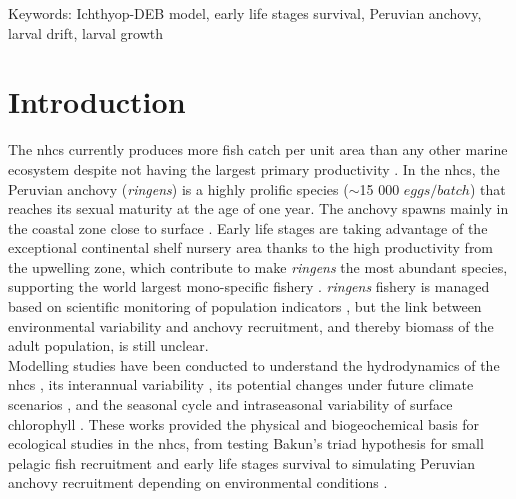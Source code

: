 Keywords: Ichthyop-DEB model, early life stages survival, Peruvian anchovy, larval drift, larval growth

\clearpage
\section{Introduction}\label{Chap3Intro}

The \acrfull{nhcs} currently produces more fish catch per unit area than any other marine ecosystem \citep{BakuWeek2008,ChavBert2008} despite not having the largest primary productivity \citep{ChavMess2009,ChecAsch2017}. In the \acrshort{nhcs}, the Peruvian anchovy (\textit{\gls{ringens}}) is a highly prolific species ($\sim$15 000 $eggs/batch$) that reaches its sexual maturity at the age of one year. The anchovy spawns mainly in the coastal zone close to surface \citep{GutiSwar2007,GutiRami2008}. Early life stages are taking advantage of the exceptional continental shelf nursery area thanks to the high productivity from the upwelling zone, which contribute to make \textit{\gls{ringens}} the most abundant species, supporting the world largest mono-specific fishery \citep{FreoMull2003,AlheNiqu2004,GutiAkes2016,ChecAsch2017,FAO2020}. \textit{\gls{ringens}} fishery is managed based on scientific monitoring of population indicators \citep{Ayon2000,GutiSwar2007}, but the link between environmental variability and anchovy recruitment, and thereby biomass of the adult population, is still unclear.\\

Modelling studies have been conducted to understand the hydrodynamics of the \acrshort{nhcs} \citep{PenvEche2005,ColaMcwi2012}, its interannual variability \citep{ColaCape2008,EspiEche2017}, its potential changes under future climate scenarios \citep{OerdCola2015,EcheGeva2020}, and the seasonal cycle and intraseasonal variability of surface chlorophyll \citep{EcheAumo2008,EcheAlbe2014}. These works provided the physical and biogeochemical basis for ecological studies in the \acrshort{nhcs}, from testing Bakun's triad hypothesis \citep{Baku1998} for small pelagic fish recruitment and early life stages survival \citep{LettPenv2007} to simulating Peruvian anchovy recruitment depending on environmental conditions \citep{BrocLett2008,BrocCola2009,BrocLett2011,BrocEche2013,XuChai2013,XuRose2015}.\\

